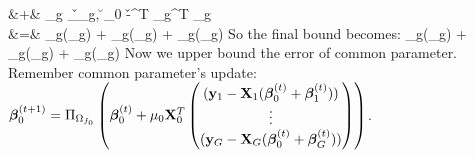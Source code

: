 \begin{IEEEproof}
	&+&  \mu_g    \sup_{\v \in \cB_g, \u \in \cB_0} -\v^T \X_g^T \X_g \u \\ \nr   
	&=&  \rho_g(\mu_g)   +   \xi_g(\mu_g)  +  \phi_g(\mu_g)  
	\ee 
	So the final bound becomes:
	\beq 
	\label{eq:optg}
	 \leq \rho_g(\mu_g)   +  \xi_g(\mu_g)  + \phi_g(\mu_g)  
	\eeq 	
	Now we upper bound the error of common parameter. Remember common parameter's update:
	$\boldsymbol{\beta} _0^{(t+1)} = \Pi_{\Omega_{f_0}} \left(\boldsymbol{\beta}_0^{(t)} + \mu_0 \mathbf{X}_0^T   
	\begin{pmatrix}
	(\mathbf{y}_1 - \mathbf{X}_1 (\boldsymbol{\beta}_0^{(t)} + \boldsymbol{\beta} _1^{(t)}))     \\
	\vdots 	 \\
	(\mathbf{y}_G - \mathbf{X}_G (\boldsymbol{\beta}_0^{(t)} + \boldsymbol{\beta} _G^{(t)})) 
	\end{pmatrix}\right)$.
	

\end{IEEEproof}
